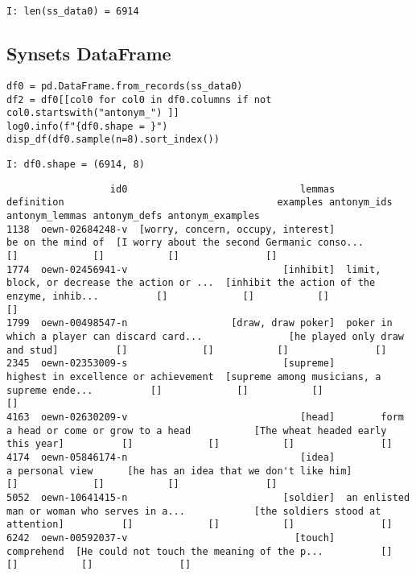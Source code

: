 \documentclass[a4paper,10pt,onecolumn,oneside,openright]{article}
\begin{document}
\begin{verbatim}
I: len(ss_data0) = 6914
\end{verbatim}

\subsection{Synsets DataFrame}
\label{sec:orgc870179}
\begin{verbatim}
df0 = pd.DataFrame.from_records(ss_data0)
df2 = df0[[col0 for col0 in df0.columns if not col0.startswith("antonym_") ]]
log0.info(f"{df0.shape = }")
disp_df(df0.sample(n=8).sort_index())
\end{verbatim}

\begin{verbatim}
I: df0.shape = (6914, 8)
\end{verbatim}

\begin{verbatim}
                  id0                              lemmas                                   definition                                     examples antonym_ids antonym_lemmas antonym_defs antonym_examples
1138  oewn-02684248-v  [worry, concern, occupy, interest]                            be on the mind of  [I worry about the second Germanic conso...          []             []           []               []
1774  oewn-02456941-v                           [inhibit]  limit, block, or decrease the action or ...  [inhibit the action of the enzyme, inhib...          []             []           []               []
1799  oewn-00498547-n                  [draw, draw poker]  poker in which a player can discard card...               [he played only draw and stud]          []             []           []               []
2345  oewn-02353009-s                           [supreme]         highest in excellence or achievement  [supreme among musicians, a supreme ende...          []             []           []               []
4163  oewn-02630209-v                              [head]        form a head or come or grow to a head           [The wheat headed early this year]          []             []           []               []
4174  oewn-05846174-n                              [idea]                              a personal view      [he has an idea that we don't like him]          []             []           []               []
5052  oewn-10641415-n                           [soldier]  an enlisted man or woman who serves in a...            [the soldiers stood at attention]          []             []           []               []
6242  oewn-00592037-v                             [touch]                                   comprehend  [He could not touch the meaning of the p...          []             []           []               []
\end{verbatim}
\end{document}
